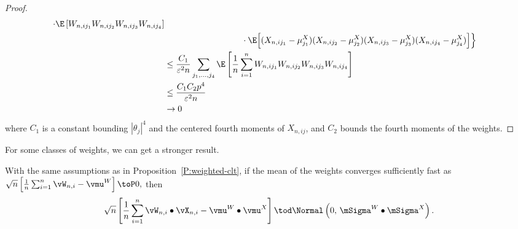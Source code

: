 \begin{proof}
\begin{align*}
                 \cdot \E \left[ 
                         W_{n,ij_1}
                         W_{n,ij_2}
                         W_{n,ij_3}
                         W_{n,ij_4}
                     \right] \\
                &\qquad\qquad\qquad\qquad\quad \cdot \E \Big[ 
                        (X_{n,ij_1} - \mu^X_{j_1})
                        (X_{n,ij_2} - \mu^X_{j_2})
                        (X_{n,ij_3} - \mu^X_{j_3})
                        (X_{n,ij_4} - \mu^X_{j_4})
                    \Big] \Big\} \\
        &\leq
            \frac{C_1}{\varepsilon^2 n}
            \sum_{j_1, \ldots, j_4}
                \E \left[
                    \frac{1}{n}
                    \sum_{i=1}^n
                        W_{n,ij_1}
                        W_{n,ij_2}
                        W_{n,ij_3}
                        W_{n,ij_4}
                \right] \\
        &\leq
            \frac{C_1 C_2 p^4}{\varepsilon^2 n} \\
        &\to 0
    \end{align*}
    where $C_1$ is a constant bounding $|\theta_{j}|^4$ and the
    centered fourth moments of $X_{n,ij}$, and $C_2$ bounds the
    fourth moments of the weights.
\end{proof}

For some classes of weights, we can get a stronger result.

\begin{corollary}\label{C:strong-weighted-clt}
    With the same assumptions as in Proposition~\ref{P:weighted-clt},
    if the mean of the weights converges sufficiently fast as
    \(
        \sqrt{n} \left[ \frac{1}{n} \sum_{i=1}^n \vW_{n,i} - \vmu^W \right] 
        \toP 
        0,
    \)
    then
    \begin{equation}
        \sqrt{n}
        \left[
            \frac{1}{n}
            \sum_{i=1}^n
                \vW_{n,i} \bullet \vX_{n,i}
            -
            \vmu^W \bullet \vmu^X
        \right]
        \tod
        \Normal\left( 0, \, \mSigma^W \bullet \mSigma^X \right).
    \end{equation}
\end{corollary}
